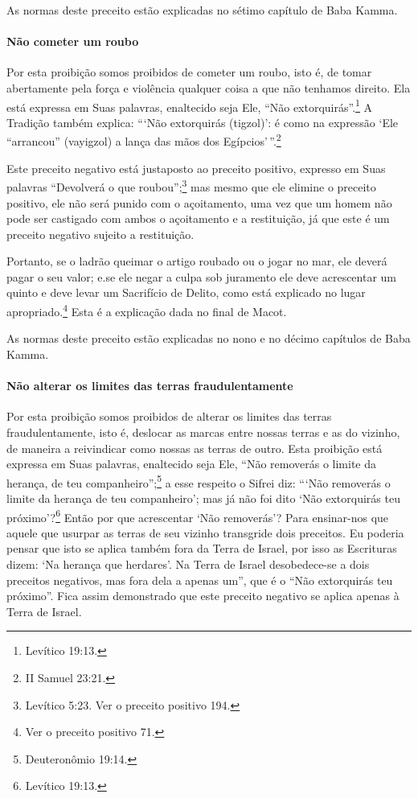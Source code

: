 As normas deste preceito estão explicadas no sétimo capítulo de Baba Kamma.

\paragraph{Não cometer um roubo}

Por esta proibição somos proibidos de cometer um roubo, isto é, de tomar
abertamente pela força e violência qualquer coisa a que não tenhamos
direito. Ela está expressa em Suas palavras, enaltecido seja Ele, ``Não
extorquirás''.\footnote{Levítico 19:13.} A Tradição também explica: ```Não
extorquirás (tigzol)': é como na expressão `Ele ``arrancou'' (vayigzol)
a lança das mãos dos Egípcios'\,''.\footnote{II Samuel 23:21.}

Este preceito negativo está justaposto ao preceito positivo, expresso
em Suas palavras ``Devolverá o que roubou'';\footnote{Levítico
5:23. Ver o preceito positivo 194.} mas mesmo que ele elimine o preceito
positivo, ele não será punido com o açoitamento, uma vez que um homem
não pode ser castigado com ambos o açoitamento e a restituição, já que este é um preceito negativo sujeito a restituição.

Portanto, se o ladrão queimar o artigo roubado ou o jogar no mar, ele
deverá pagar o seu valor; e.se ele negar a culpa sob juramento ele deve
acrescentar um quinto e deve levar um Sacrifício de Delito, como está
explicado no lugar apropriado.\footnote{Ver o preceito positivo 71.} Esta é a explicação
dada no final de Macot.

As normas deste preceito estão explicadas no nono e no décimo capítulos de Baba Kamma.

\paragraph{Não alterar os limites das terras fraudulentamente}

Por esta proibição somos proibidos de alterar os limites das terras
fraudulentamente, isto é, deslocar as marcas entre nossas terras e as do
vizinho, de maneira a reivindicar como nossas as terras de outro. Esta
proibição está expressa em Suas palavras, enaltecido seja Ele, ``Não
removerás o limite da herança, de teu companheiro'';\footnote{Deuteronômio
19:14.} a esse respeito o Sifrei diz: ```Não removerás o limite da
herança de teu companheiro'; mas já não foi dito `Não extorquirás teu
próximo'?\footnote{Levítico 19:13.} Então por que acrescentar `Não removerás'?
Para ensinar-nos que aquele que usurpar as terras de seu vizinho
transgride dois preceitos. Eu poderia pensar que isto se aplica também
fora da Terra de Israel, por isso as Escrituras dizem: `Na herança que
herdares'. Na Terra de Israel desobedece-se a dois preceitos negativos,
mas fora dela a apenas um'', que é o ``Não extorquirás teu próximo''.
Fica assim demonstrado que este preceito negativo se aplica apenas à
Terra de Israel.

